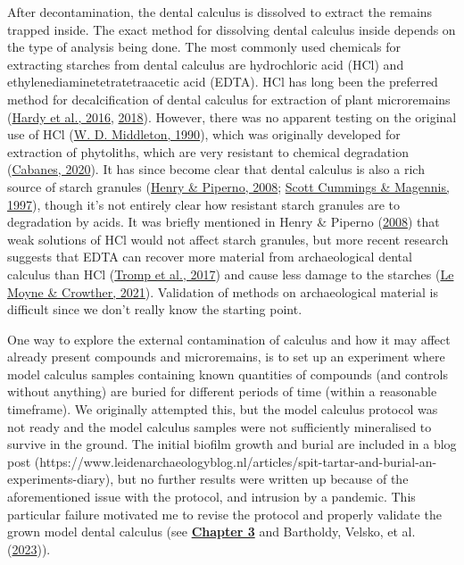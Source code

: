 \documentclass[
  letterpaper,
]{book}
\begin{document}
After decontamination, the dental calculus is dissolved to extract the
remains trapped inside. The exact method for dissolving dental calculus
inside depends on the type of analysis being done. The most commonly
used chemicals for extracting starches from dental calculus are
hydrochloric acid (HCl) and ethylenediaminetetratetraacetic acid (EDTA).
HCl has long been the preferred method for decalcification of dental
calculus for extraction of plant microremains
(\protect\hyperlink{ref-hardyDentalCalculus2016}{Hardy et al., 2016},
\protect\hyperlink{ref-hardyRecoveringInformation2018}{2018}). However,
there was no apparent testing on the original use of HCl
(\protect\hyperlink{ref-middletonImprovedMethod1990}{W. D. Middleton,
1990}), which was originally developed for extraction of phytoliths,
which are very resistant to chemical degradation
(\protect\hyperlink{ref-cabanesPhytolithAnalysis2020}{Cabanes, 2020}).
It has since become clear that dental calculus is also a rich source of
starch granules (\protect\hyperlink{ref-henryCalculusSyria2008}{Henry \&
Piperno, 2008}; \protect\hyperlink{ref-cummingsMayanCalculus1997}{Scott
Cummings \& Magennis, 1997}), though it's not entirely clear how
resistant starch granules are to degradation by acids. It was briefly
mentioned in Henry \& Piperno
(\protect\hyperlink{ref-henryCalculusSyria2008}{2008}) that weak
solutions of HCl would not affect starch granules, but more recent
research suggests that EDTA can recover more material from
archaeological dental calculus than HCl
(\protect\hyperlink{ref-trompEDTACalculus2017}{Tromp et al., 2017}) and
cause less damage to the starches
(\protect\hyperlink{ref-lemoyneCalculusPretreatments2021}{Le Moyne \&
Crowther, 2021}). Validation of methods on archaeological material is
difficult since we don't really know the starting point.

One way to explore the external contamination of calculus and how it may
affect already present compounds and microremains, is to set up an
experiment where model calculus samples containing known quantities of
compounds (and controls without anything) are buried for different
periods of time (within a reasonable timeframe). We originally attempted
this, but the model calculus protocol was not ready and the model
calculus samples were not sufficiently mineralised to survive in the
ground. The initial biofilm growth and burial are included in a blog
post
(https://www.leidenarchaeologyblog.nl/articles/spit-tartar-and-burial-an-experiments-diary),
but no further results were written up because of the aforementioned
issue with the protocol, and intrusion by a pandemic. This particular
failure motivated me to revise the protocol and properly validate the
grown model dental calculus (see
\protect\hyperlink{byoc-valid}{\textbf{Chapter 3}} and Bartholdy,
Velsko, et al.
(\protect\hyperlink{ref-bartholdyAssessingValidity2023}{2023})).
\end{document}
